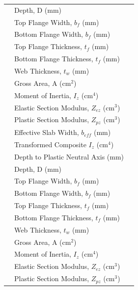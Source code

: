 \documentclass[12pt,a4paper]{report}
\numberwithin{table}{chapter}
\numberwithin{figure}{chapter}
\begin{document}
\begin{longtable}{|C{2.5cm}|L{8.0cm}|>{\centering\arraybackslash}p{5.0cm}|}
\hline
\endlastfoot
{} & \textnormal{Depth, D (mm)} &  \\[6pt]
 & \textnormal{Top Flange Width, $b_f$ (mm)} &  \\[6pt]
 & \textnormal{Bottom Flange Width, $b_f$ (mm)} &  \\[6pt]
 & \textnormal{Top Flange Thickness, $t_f$ (mm)} &  \\[6pt]
 & \textnormal{Bottom Flange Thickness, $t_f$ (mm)} &  \\[6pt]
 & \textnormal{Web Thickness, $t_w$ (mm)} &  \\[6pt]
 & \textnormal{Gross Area, A (cm$^2$)} &  \\[6pt]
 & \textnormal{Moment of Inertia, $I_z$ (cm$^4$)} &  \\[6pt]
 & \textnormal{Elastic Section Modulus, $Z_{ez}$ (cm$^3$)} &  \\[6pt]
 & \textnormal{Plastic Section Modulus, $Z_{pz}$ (cm$^3$)} &  \\[6pt]
 & \textnormal{Effective Slab Width, $b_{eff}$ (mm)} &  \\[6pt]
 & \textnormal{Transformed Composite $I_z$ (cm$^4$)} &  \\[6pt]
 & \textnormal{Depth to Plastic Neutral Axis (mm)} &  \\[6pt]
\hline
{} & \textnormal{Depth, D (mm)} &  \\[6pt]
 & \textnormal{Top Flange Width, $b_f$ (mm)} &  \\[6pt]
 & \textnormal{Bottom Flange Width, $b_f$ (mm)} &  \\[6pt]
 & \textnormal{Top Flange Thickness, $t_f$ (mm)} &  \\[6pt]
 & \textnormal{Bottom Flange Thickness, $t_f$ (mm)} &  \\[6pt]
 & \textnormal{Web Thickness, $t_w$ (mm)} &  \\[6pt]
 & \textnormal{Gross Area, A (cm$^2$)} &  \\[6pt]
 & \textnormal{Moment of Inertia, $I_z$ (cm$^4$)} &  \\[6pt]
 & \textnormal{Elastic Section Modulus, $Z_{ez}$ (cm$^3$)} &  \\[6pt]
 & \textnormal{Plastic Section Modulus, $Z_{pz}$ (cm$^3$)} &  \\[6pt]

\end{longtable}
\end{document}
